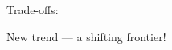\documentclass[
    xcolor={svgnames,dvipsnames},
    hyperref={colorlinks, citecolor=DeepPink4, linkcolor=DarkRed, urlcolor=DarkBlue}
    ]{beamer}  %
\newcommand{\1}{\mathbbm 1}
\begin{document}
\begin{frame}

    Trade-offs:
    
    \begin{figure}
        \centering
    \end{figure}


\end{frame}



\begin{frame}[fragile]

    New trend --- a shifting frontier!

\end{frame}




\begin{frame}
    
    \begin{figure}
        \centering
    \end{figure}

\end{frame}
\end{document}
